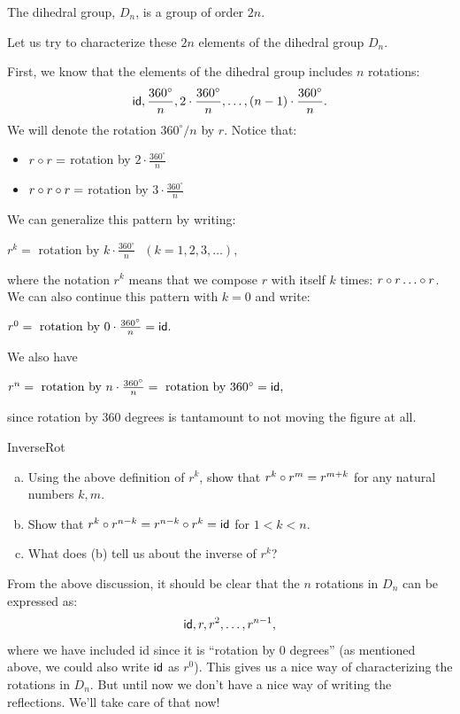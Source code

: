  
\begin{prop}{}
The dihedral group, $D_n$, is a group of order $2n$.
\end{prop}
 

Let us try to characterize these $2n$ elements of the dihedral group $D_n$. 
\medskip

First, we know that the elements of the dihedral group includes $n$ rotations:
\[
{\sf{i}d}, \frac{360^{\circ} }{n}, 2 \cdot \frac{360^{\circ} }{n},
\ldots, (n-1) \cdot \frac{360^{\circ} }{n}.
\]
We will denote the rotation $360^{\circ} /n$ by $r$. Notice that:
\begin{itemize}
\item
$r \circ r = $ rotation by  $2 \cdot \frac{360^{\circ} }{n}$
\item
$r \circ r \circ r = $ rotation by  $3 \cdot \frac{360^{\circ} }{n}$
\end{itemize}

\noindent
We can generalize this pattern by writing:
\medskip

$r^k = \mbox{ rotation by } k \cdot \frac{360^{\circ} }{n}~~~(k=1,2,3,\ldots),$
\medskip

\noindent
where the notation $r^k$ means that we compose  $r$ with itself $k$ times: $r \circ r \ldots \circ r$.
We can also continue this pattern with $k=0$ and  write:
\medskip

$r^0 = \mbox{ rotation by } 0 \cdot \frac{360^{\circ} }{n} = \sf{id}.$
\medskip

We also have
\medskip

$r^n = \mbox{ rotation by } n \cdot \frac{360^{\circ} }{n} = \mbox{ rotation by } 360^{\circ} = {\sf{i}d},$
\medskip

\noindent
since rotation by 360 degrees is tantamount to not moving the figure at all.


\begin{exercise}{InverseRot}
\begin{enumerate}[(a)]
\item
Using the above definition of $r^k$, show that $r^k \circ r^m = r^{m+k}$ for any natural numbers $k,m$.
\item
Show that $r^k \circ r^{n-k} = r^{n-k} \circ r^k = {\sf{i}d}$
 for $1 < k < n$.  
\item
What does (b) tell us about the inverse of $r^k$?
\end{enumerate}
\end{exercise}

From the above discussion, it should be clear that the $n$ rotations in $D_n$ can be expressed as:
\[{\sf{i}d}, r, r^2, \ldots, r^{n-1},\]
where we have included {\var id} since it is ``rotation by 0 degrees'' (as mentioned above, we could also write $\sf{id}$ as $r^0$).  This gives us a nice way of characterizing the rotations in $D_n$.  But until now we don't have a nice way of writing the reflections. We'll take care of that now!

